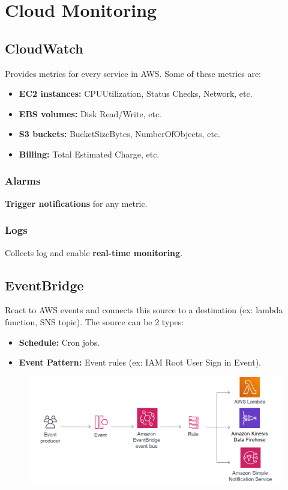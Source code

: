 \section{Cloud Monitoring}\label{sec:cloud-monitoring}

\subsection{CloudWatch}\label{subsec:cloudwatch}
Provides metrics for every service in AWS. Some of these metrics are:

\begin{itemize}
    \item{\textbf{EC2 instances:} CPUUtilization, Status Checks, Network, etc.}
    \item{\textbf{EBS volumes:} Disk Read/Write, etc.}
    \item{\textbf{S3 buckets:} BucketSizeBytes, NumberOfObjects, etc.}
    \item{\textbf{Billing:} Total Estimated Charge, etc.}
\end{itemize}

\subsubsection{Alarms}
\textbf{Trigger notifications} for any metric.

\subsubsection{Logs}
Collects log and enable \textbf{real-time monitoring}\@.

\subsection{EventBridge}\label{subsec:eventbridge}
React to AWS events and connects this source to a destination (ex: lambda function, SNS topic).
The source can be 2 types:

\begin{itemize}
    \item{\textbf{Schedule:} Cron jobs.}
    \item{\textbf{Event Pattern:} Event rules (ex: IAM Root User Sign in Event).}
\end{itemize}

\begin{figure}[h]
    \includegraphics[scale=0.30]{cloud-monitoring/eventbridge}
    \centering
    \label{fig:eventbridge}
\end{figure}

